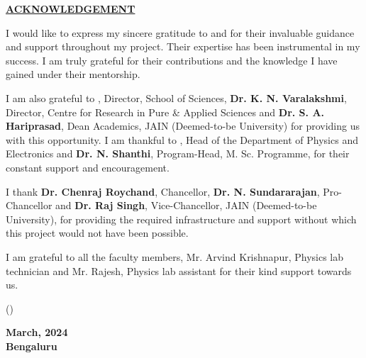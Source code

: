 \thispagestyle{empty}

\begin{center}

    \Large{\underline{\textbf{ACKNOWLEDGEMENT}}}\\

\end{center}

\vspace{1cm}

\noindent
I would like to express my sincere gratitude to \textbf{\gnameOne} and \textbf{\gnameTwo} for their
invaluable guidance and support throughout my project.
Their expertise has been instrumental in my success. I am truly grateful for their contributions
and the knowledge I have gained under their mentorship.

\vspace{0.5cm}

\noindent
I am also grateful to \textbf{\director}, Director, School of Sciences,
\textbf{Dr. K. N. Varalakshmi}, Director, Centre for Research in Pure \& Applied Sciences and
\textbf{Dr. S. A. Hariprasad}, Dean Academics, JAIN (Deemed-to-be
University) for providing us with this opportunity. I am thankful to
\textbf{\hod}, Head of the Department of Physics and Electronics and
\textbf{Dr. N. Shanthi}, Program-Head, M. Sc. Programme, for their constant
support and encouragement.

\vspace{0.5cm}

\noindent
I thank \textbf{Dr. Chenraj Roychand}, Chancellor, \textbf{Dr. N. Sundararajan},
Pro-Chancellor and \textbf{Dr. Raj Singh}, Vice-Chancellor, JAIN (Deemed-to-be University), for
providing the required infrastructure and support without which this project would not have
been possible.

\vspace{0.5cm}

\noindent
I am grateful to all the faculty members, Mr. Arvind Krishnapur, Physics lab technician and Mr. Rajesh, Physics lab assistant for their kind support towards us.

\vspace{1.5cm}

\noindent
\begin{minipage}{0.5\textwidth}

    (\auth)

\end{minipage}%
\begin{minipage}{0.5\textwidth}
    \flushright

    \textbf{March, 2024\\
        Bengaluru}
\end{minipage}

